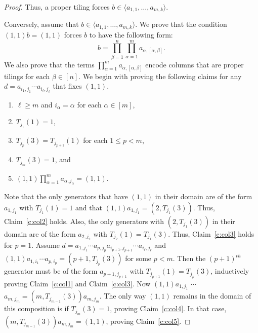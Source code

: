 \documentclass{amsart}
\theoremstyle{remark}
\numberwithin{equation}{section}
\begin{document}
\begin{proof}
Thus, a proper tiling forces $b \in \langle a_{1,1} , \dots, a_{m,k} \rangle$.

Conversely, assume that $b \in \langle a_{1,1}, \dots, a_{m,k} \rangle$. We prove that the condition $(1,1)b=(1,1)$ forces $b$ to have the following form:
\begin{equation} \label{eq:b}
b = \prod_{\beta=1}^n \prod_{\alpha=1}^m a_{\alpha,[\alpha,\beta]}.
\end{equation}
We also prove that the terms $\prod_{\alpha=1}^m a_{\alpha,[\alpha,\beta]}$ encode columns that are proper tilings for each $\beta \in [n]$. We begin with proving the following claims for any $d = a_{i_1,j_1} \cdots a_{i_\ell,j_\ell}$ that fixes $(1,1)$.

\begin{enumerate}
\item $\ell \geq m$ and $i_\alpha = \alpha$ for each $\alpha \in [m]$, \label{c:col1}
\item $T_{j_1}(1) = 1$, \label{c:col2}
\item $T_{j_p}(3) = T_{j_{p+1}}(1)$ for each $1 \leq p < m$, \label{c:col3}
\item $T_{j_m}(3) = 1$, and \label{c:col4}
\item $(1,1)\prod_{\alpha=1}^m a_{\alpha,j_\alpha}=(1,1)$. \label{c:col5}
\end{enumerate}

Note that the only generators that have $(1,1)$ in their domain are of the form $a_{1,j_1}$ with $T_{j_1}(1) = 1$ and that $(1,1)a_{1,j_1} = (2,T_{j_1}(3))$. Thus, Claim~\ref{c:col2} holds. Also, the only generators with $(2,T_{j_1}(3))$ in their domain are of the form $a_{2,j_2}$ with $T_{j_2}(1) = T_{j_1}(3)$. Thus, Claim~\ref{c:col3} holds for $p=1$. Assume $d = a_{1,j_1} \cdots a_{p,j_p} a_{i_{p+1},j_{p+1}} \cdots a_{i_\ell,j_\ell}$ and $(1,1)a_{1,i_1} \cdots a_{p,i_p} = (p+1,T_{j_p}(3))$ for some $p < m$. Then the $(p+1)^{th}$ generator must be of the form $a_{p+1,j_{p+1}}$ with $T_{j_{p+1}}(1) = T_{j_p}(3)$, inductively proving Claim~\ref{c:col1} and Claim~\ref{c:col3}. Now $(1,1)a_{1,j_1}$ $\cdots$ $a_{m,j_m} = (m,T_{j_{m-1}}(3))a_{m,j_m}$. The only way $(1,1)$ remains in the domain of this composition is if $T_{j_m}(3) = 1$, proving Claim~\ref{c:col4}. In that case, $(m,T_{j_{m-1}}(3))a_{m,j_m} = (1,1)$, proving Claim~\ref{c:col5}.


\end{proof}
\end{document}
